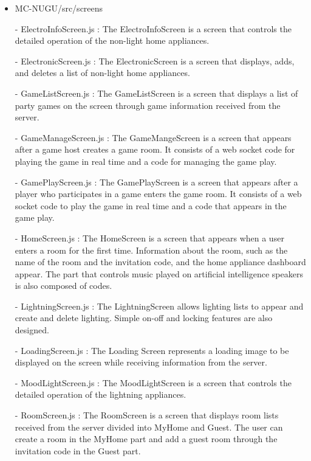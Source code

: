 \documentclass[conference]{IEEEtran}
\begin{document}
\begin{itemize}
                \item MC-NUGU/src/screens
                    \item[-] ElectroInfoScreen.js : The ElectroInfoScreen is a screen that controls the detailed operation of the non-light home appliances.
                    \item[-] ElectronicScreen.js : The ElectronicScreen is a screen that displays, adds, and deletes a list of non-light home appliances. 
                    \item[-] GameListScreen.js : The GameListScreen is a screen that displays a list of party games on the screen through game information received from the server.
                    \item[-] GameManageScreen.js : The GameMangeScreen is a screen that appears after a game host creates a game room. It consists of a web socket code for playing the game in real time and a code for managing the game play.
                    \item[-] GamePlayScreen.js : The GamePlayScreen is a screen that appears after a player who participates in a game enters the game room. It consists of a web socket code to play the game in real time and a code that appears in the game play.
                    \item[-] HomeScreen.js : The HomeScreen is a screen that appears when a user enters a room for the first time. Information about the room, such as the name of the room and the invitation code, and the home appliance dashboard appear. The part that controls music played on artificial intelligence speakers is also composed of codes.
                    \item[-] LightningScreen.js : The LightningScreen allows lighting lists to appear and create and delete lighting. Simple on-off and locking features are also designed.
                    \item[-] LoadingScreen.js : The Loading Screen represents a loading image to be displayed on the screen while receiving information from the server.
                    \item[-] MoodLightScreen.js : The MoodLightScreen is a screen that controls the detailed operation of the lightning appliances.
                    \item[-] RoomScreen.js : The RoomScreen is a screen that displays room lists received from the server divided into MyHome and Guest. The user can create a room in the MyHome part and add a guest room through the invitation code in the Guest part.

\end{itemize}
\end{document}
